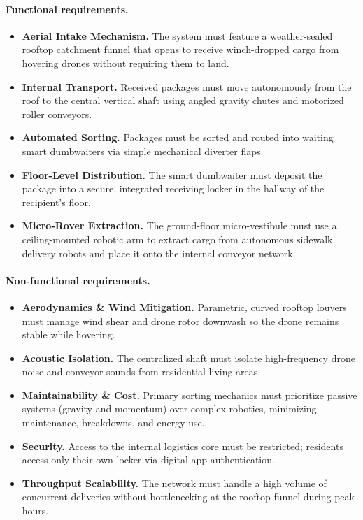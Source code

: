 \documentclass[11pt,a4paper]{report}
\begin{document}
\paragraph{Functional requirements.}
\begin{itemize}
    \item \textbf{Aerial Intake Mechanism.} The system must feature a
    weather-sealed rooftop catchment funnel that opens to receive
    winch-dropped cargo from hovering drones without requiring them to
    land.
    \item \textbf{Internal Transport.} Received packages must move
    autonomously from the roof to the central vertical shaft using
    angled gravity chutes and motorized roller conveyors.
    \item \textbf{Automated Sorting.} Packages must be sorted and
    routed into waiting smart dumbwaiters via simple mechanical
    diverter flaps.
    \item \textbf{Floor-Level Distribution.} The smart dumbwaiter must
    deposit the package into a secure, integrated receiving locker in
    the hallway of the recipient's floor.
    \item \textbf{Micro-Rover Extraction.} The ground-floor
    micro-vestibule must use a ceiling-mounted robotic arm to extract
    cargo from autonomous sidewalk delivery robots and place it onto
    the internal conveyor network.
\end{itemize}

\paragraph{Non-functional requirements.}
\begin{itemize}
    \item \textbf{Aerodynamics \& Wind Mitigation.} Parametric, curved
    rooftop louvers must manage wind shear and drone rotor downwash so
    the drone remains stable while hovering.
    \item \textbf{Acoustic Isolation.} The centralized shaft must
    isolate high-frequency drone noise and conveyor sounds from
    residential living areas.
    \item \textbf{Maintainability \& Cost.} Primary sorting mechanics
    must prioritize passive systems (gravity and momentum) over complex
    robotics, minimizing maintenance, breakdowns, and energy use.
    \item \textbf{Security.} Access to the internal logistics core
    must be restricted; residents access only their own locker via
    digital app authentication.
    \item \textbf{Throughput Scalability.} The network must handle a
    high volume of concurrent deliveries without bottlenecking at the
    rooftop funnel during peak hours.
\end{itemize}
\end{document}
